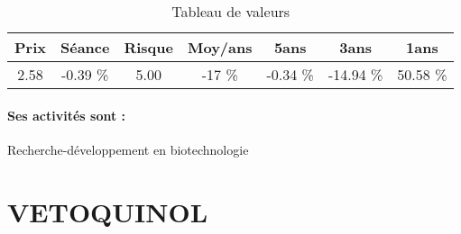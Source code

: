 \documentclass[11pt,a4paper]{report}%
\begin{document}
\begin{table}[H]
  \centering
    \begin{tabular}{|c|c|c|c|c|c|c|}
    \hline
    Prix & Séance & Risque  & Moy/ans & 5ans & 3ans & 1ans \\
    \hline
    2.58 &    -0.39 \%    & 5.00 & -17 \% & -0.34 \% & -14.94 \% & 50.58 \% \\
    \hline
    \end{tabular}%
        \label{tab:table_TRANSGENE}%
      \caption{Tableau de valeurs}
\end{table}%

\paragraph{Ses activités sont : } Recherche-développement en biotechnologie 
    
    \newpage

\section{VETOQUINOL}
\end{document}
